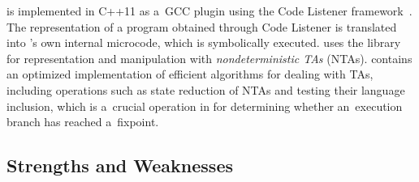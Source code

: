 \forester{} is implemented in C++11 as a~GCC plugin
using the Code Listener framework~\cite{codelistener}.
The representation of a program obtained through Code Listener is translated
into \forester{}'s own internal microcode, which is symbolically executed.
\forester{} uses the \vata{} library~\cite{VATA} for representation and
manipulation with \emph{nondeterministic TAs} (NTAs).
\vata{} contains an optimized implementation of efficient algorithms for dealing
with TAs, including operations such as state reduction of NTAs and testing their language inclusion, which is a~crucial operation in \forester{} for
determining whether an~execution branch has reached a~fixpoint.

\subsection{Strengths and Weaknesses}\label{sec:strengths}

